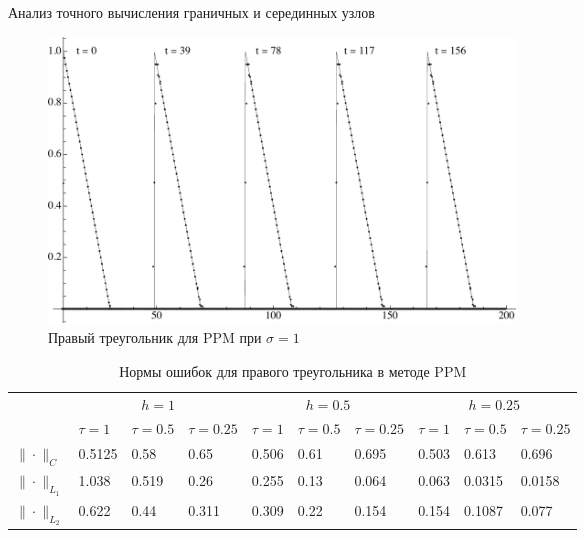 \documentclass[unicode, 8pt]{beamer}
\begin{document}
    \begin{frame}{Анализ точного вычисления граничных и серединных узлов}
        \begin{figure}[h]
            \centering
            \includegraphics[width=0.6\textwidth]{sigma=1./advectionPPM_rightTriangle.pdf}
            \caption{Правый треугольник для PPM при $ \sigma = 1 $}
            \label{fig:ppm_rightTriangle_1}
        \end{figure}
        \begin{table}[h]
            \centering
            \caption{Нормы ошибок для правого треугольника в методе PPM}
            \label{table:ltPPM}
            \scalebox{0.75} {
                \begin{tabular}{|*{10}{C{.45in}|}}
                    \hline
                    &  &  &  \\
                    & $\tau=1$ & $\tau=0.5$ & $\tau=0.25$ & $\tau=1$ & $\tau=0.5$ & $\tau=0.25$ & $\tau=1$ & $\tau=0.5$ & $\tau=0.25$ 
                    \\ \hline
                    $\| \cdot \|_{C}$ & 0.5125 & 0.58 & 0.65 & 0.506 & 0.61 & 0.695 & 0.503 & 0.613 & 0.696
                    \\ \hline
                    $\| \cdot \|_{L_1}$ & 1.038 & 0.519 & 0.26 & 0.255 & 0.13 & 0.064 & 0.063 & 0.0315 & 0.0158
                    \\ \hline
                    $\| \cdot \|_{L_2}$ & 0.622 & 0.44 & 0.311 & 0.309 & 0.22 & 0.154 & 0.154 & 0.1087 & 0.077
                    \\ \hline
                \end{tabular}
            }
        \end{table}
    \end{frame}
\end{document}
